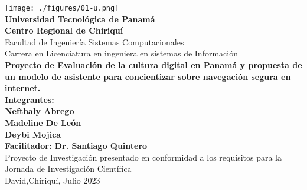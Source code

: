 \documentclass[12pt,letterpaper,fleqn]{report}
\begin{document}
\pagestyle{empty}
\begin{center}
    \parbox[c][\textheight][t]{\textwidth}{
        \begin{center}
            \texttt{[image: ./figures/01-u.png]}\\
            \vspace{0.25cm}
           {\normalsize \bf Universidad Tecnológica de Panamá}\\ \vspace{-0.15cm} 
                {\normalsize \bf Centro Regional de Chiriquí}\\ \vspace{-0.10cm}
            {\normalsize Facultad de Ingeniería Sistemas Computacionales}\\ \vspace{-0.15cm} 
            {\normalsize Carrera en Licenciatura en ingeniera en sistemas de Información}\\
            \vspace{2cm}
            {\normalsize \bf Proyecto de Evaluación de la cultura digital en Panamá y propuesta de un modelo de asistente para concientizar sobre navegación segura en internet.} \\
            \vspace{2cm}
            {\normalsize \bf Integrantes: } \\
            {\normalsize \bf Nefthaly Abrego } \\
            {\normalsize \bf Madeline De León} \\
            {\normalsize \bf Deybi Mojica    } \\ 
             \vspace{2cm}
            {\normalsize \bf Facilitador: Dr. Santiago Quintero} \\
            \vfill
            Proyecto de Investigación presentado en conformidad a los requisitos para la Jornada de Investigación Científica \\
            \vspace{0.5cm}
            David,Chiriquí,  Julio 2023
        \end{center}
        }
\end{center}


\cleardoublepage
\end{document}
